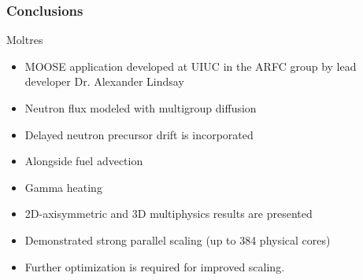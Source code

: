 \begin{frame}
  \frametitle{Conclusions}
		\begin{block}{Moltres}
		\begin{itemize}
                        \item \gls{MOOSE} application developed at UIUC 
                                in the \gls{ARFC} group by lead developer Dr. 
                                Alexander Lindsay
                        \item Neutron flux modeled with multigroup diffusion
                        \item Delayed neutron precursor drift is incorporated
                        \item Alongside fuel advection
                        \item Gamma heating
                        \item 2D-axisymmetric and 3D multiphysics results are presented
                        \item Demonstrated strong parallel scaling (up to 384 physical cores) 
                \item Further optimization is required for improved scaling.
        \end{itemize}
        \end{block}
        
\end{frame}

